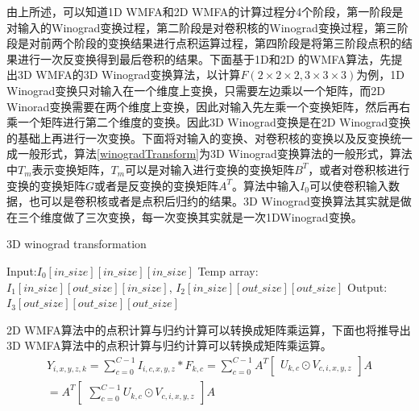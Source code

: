 由上所述，可以知道1D WMFA和2D WMFA的计算过程分4个阶段，第一阶段是对输入的Winograd变换过程，第二阶段是对卷积核的Winograd变换过程，第三阶段是对前两个阶段的变换结果进行点积运算过程，第四阶段是将第三阶段点积的结果进行一次反变换得到最后卷积的结果。下面基于1D和2D 的WMFA算法，先提出3D WMFA的3D Winograd变换算法，以计算$F(2\times 2 \times 2, 3 \times 3\times 3)$为例，1D Winograd变换只对输入在一个维度上变换，只需要左边乘以一个矩阵，而2D Winorad变换需要在两个维度上变换，因此对输入先左乘一个变换矩阵，然后再右乘一个矩阵进行第二个维度的变换。因此3D Winograd变换是在2D Winograd变换的基础上再进行一次变换。下面将对输入的变换、对卷积核的变换以及反变换统一成一般形式，算法\ref{winogradTransform}为3D Winograd变换算法的一般形式，算法中$T_m$表示变换矩阵，$T_m$可以是对输入进行变换的变换矩阵$B^T$，或者对卷积核进行变换的变换矩阵$G$或者是反变换的变换矩阵$A^T$。算法中输入$I_0$可以使卷积输入数据，也可以是卷积核或者是点积后归约的结果。3D Winograd变换算法其实就是做在三个维度做了三次变换，每一次变换其实就是一次1DWinograd变换。
\begin{algorithm}
\caption{3D winograd transformation}
\label{winogradTransform}
\begin{algorithmic}
\STATE Input:$I_0[in\_size][in\_size][in\_size]$ 
\STATE Temp array: $I_1[in\_size][out\_size][in\_size]$, $I_2[in\_size][out\_size][out\_size]$
\STATE Output: $I_3[out\_size][out\_size][out\_size]$
	\ENDFOR
\ENDFOR

	\ENDFOR
\ENDFOR

	\ENDFOR
\ENDFOR
\end{algorithmic}
\end{algorithm}

2D WMFA算法中的点积计算与归约计算可以转换成矩阵乘运算，下面也将推导出3D WMFA算法中的点积计算与归约计算可以转换成矩阵乘运算。
\begin{equation}
\begin{split}
Y_{i,x,y,z,k} = \sum_{c=0}^{C-1}I_{i,c,x,y,z}\ast F_{k,c} = \sum_{c=0}^{C-1}A^T\begin{bmatrix}
U_{k,c}\odot V_{c,i,x,y,z}
\end{bmatrix}A \\
= A^T\begin{bmatrix}
\sum_{c=0}^{C-1}U_{k,c}\odot V_{c,i,x,y,z}
\end{bmatrix}A
\end{split}
\end{equation}

